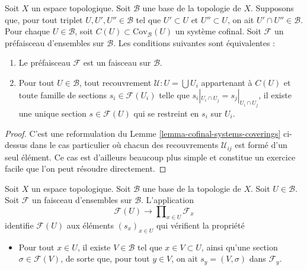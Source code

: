 \begin{lemma}
\label{lemma-cofinal-systems-coverings-standard-case}
Soit $X$ un espace topologique. Soit $\mathcal{B}$ une base de la
topologie de $X$. Supposons que, pour tout triplet $U, U', U'' \in \mathcal{B}$
tel que $U' \subset U$ et $U'' \subset U$, on ait $U' \cap U'' \in \mathcal{B}$.
Pour chaque $U \in \mathcal{B}$, soit $C(U) \subset \text{Cov}_\mathcal{B}(U)$
un système cofinal.
Soit $\mathcal{F}$ un préfaisceau d'ensembles sur $\mathcal{B}$.
Les conditions suivantes sont équivalentes :
\begin{enumerate}
\item Le préfaisceau $\mathcal{F}$ est un faisceau sur $\mathcal{B}$.
\item Pour tout $U \in \mathcal{B}$, tout recouvrement
$\mathcal{U} : U = \bigcup U_i$ appartenant à $C(U)$ et toute
famille de sections $s_i \in \mathcal{F}(U_i)$ telle
que $s_i|_{U_i \cap U_j} = s_j|_{U_i \cap U_j}$, il
existe une unique section $s \in \mathcal{F}(U)$ qui
se restreint en $s_i$ sur $U_i$.
\end{enumerate}
\end{lemma}

\begin{proof}
C'est une reformulation du
Lemme \ref{lemma-cofinal-systems-coverings} ci-dessus
dans le cas particulier où chacun des recouvrements $\mathcal{U}_{ij}$
est formé d'un seul élément. Ce cas est d'ailleurs beaucoup
plus simple et constitue un exercice facile que l'on peut résoudre directement.
\end{proof}

\begin{lemma}
\label{lemma-condition-star-sections}
Soit $X$ un espace topologique.
Soit $\mathcal{B}$ une base de la topologie de $X$.
Soit $U \in \mathcal{B}$.
Soit $\mathcal{F}$ un faisceau d'ensembles sur $\mathcal{B}$.
L'application
$$
\mathcal{F}(U) \to \prod\nolimits_{x \in U} \mathcal{F}_x
$$
identifie $\mathcal{F}(U)$ aux éléments $(s_x)_{x\in U}$
qui vérifient la propriété
\begin{itemize}
\item[(*)] Pour tout $x \in U$, il existe $V \in \mathcal{B}$
tel que $x \in V \subset U$, ainsi qu'une section $\sigma \in \mathcal{F}(V)$,
de sorte que, pour tout $y \in V$, on ait $s_y = (V, \sigma)$ dans $\mathcal{F}_y$.
\end{itemize}
\end{lemma}

